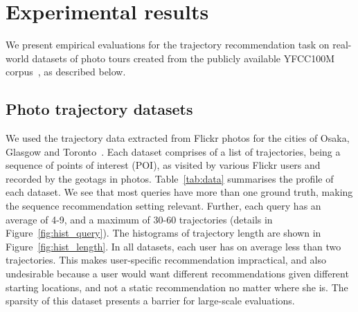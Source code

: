 
\section{Experimental results}
\label{sec:experiment}


We present empirical evaluations for the trajectory recommendation task %
on real-world datasets of photo tours
created from the publicly available YFCC100M corpus~\cite{thomee2016yfcc100m}, as described below.


\subsection{Photo trajectory datasets}
\label{sec:dataset}

We used the trajectory data %
extracted from Flickr photos for the cities of Osaka, Glasgow and Toronto~\cite{ijcai15,cikm16paper}.
Each dataset comprises of a list of trajectories, being a sequence of points of interest (POI),
as visited by various Flickr users and recorded by the geotags in photos.
Table~\ref{tab:data} summarises the profile of each dataset.
We see that most queries have more than one ground truth, making the sequence recommendation setting relevant. Further, each query has an average of 4-9, and a maximum of 30-60 trajectories (details in Figure~\ref{fig:hist_query}).
The histograms of trajectory length are shown in Figure~\ref{fig:hist_length}.
In all datasets,
each user has on average less than two trajectories.
This makes user-specific recommendation impractical, and also undesirable because
a user would want different recommendations given different starting locations, and not a static recommendation no matter where she is.
The sparsity of this dataset presents a barrier for large-scale evaluations.

